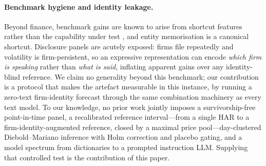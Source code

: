 \paragraph{Benchmark hygiene and identity leakage.}
Beyond finance, benchmark gains are known to arise from shortcut features rather than the capability under test \citep{geirhos2020shortcut}, and entity memorisation is a canonical shortcut. Disclosure panels are acutely exposed: firms file repeatedly and volatility is firm-persistent, so an expressive representation can encode \emph{which firm is speaking} rather than \emph{what is said}, inflating apparent gains over any identity-blind reference. We claim no generality beyond this benchmark; our contribution is a protocol that makes the artefact measurable in this instance, by running a zero-text firm-identity forecast through the same combination machinery as every text model. To our knowledge, no prior work jointly imposes a survivorship-free point-in-time panel, a recalibrated reference interval---from a single HAR to a firm-identity-augmented reference, closed by a maximal price pool---day-clustered Diebold--Mariano inference with Holm correction and placebo gating, and a model spectrum from dictionaries to a prompted instruction LLM. Supplying that controlled test is the contribution of this paper.

